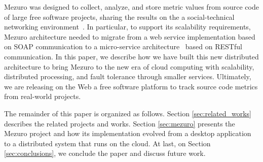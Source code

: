 Mezuro was designed to collect, analyze, and store metric values from source
code of large free software projects, sharing the results on the a
social-technical networking environment~\cite{mezuro2012}. In particular, to
support its scalability requirements, Mezuro architecture needed to migrate
from a web service implementation based on SOAP communication to a
micro-service architecture~\cite{namiot2014micro} based on RESTful
communication. In this paper, we describe how we have built this new
distributed architecture to bring Mezuro to the new era of cloud computing with
scalability, distributed processing, and fault tolerance through smaller
services. Ultimately, we are releasing on the Web a free software platform to
track source code metrics from real-world projects.

The remainder of this paper is organized as follows. Section
\ref{sec:related_works} describes the related projects and works. Section
\ref{sec:mezuro} presents the Mezuro project and how its implementation evolved
from a desktop application to a distributed system that runs on the cloud. At
last, on Section \ref{sec:conclusions}, we conclude the paper and discuss
future work.
